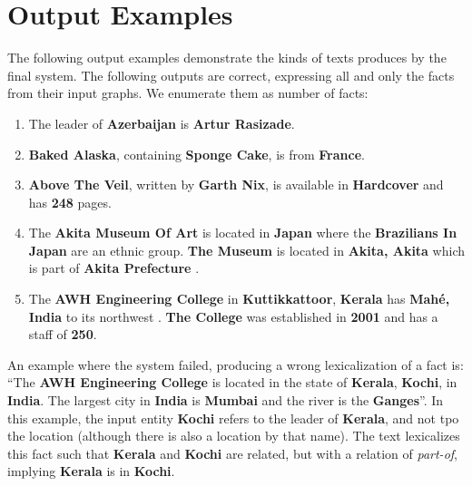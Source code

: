 \documentclass[11pt,a4paper,table,xcdraw]{article}
\begin{document}
\section{Output Examples}
The following output examples demonstrate the kinds of texts produces by the final system. 
The following outputs are correct, expressing all and only the facts from their input graphs. We enumerate them as number of facts:
\begin{enumerate}
    \item The leader of \textbf{Azerbaijan} is \textbf{Artur Rasizade}.
    \item \textbf{Baked Alaska}, containing \textbf{Sponge Cake}, is from \textbf{France}.
    \item \textbf{Above The Veil}, written by \textbf{Garth Nix}, is available in \textbf{Hardcover} and has \textbf{248} pages.
    \item The \textbf{Akita Museum Of Art} is located in \textbf{Japan} where the \textbf{Brazilians In Japan} are an ethnic group. \textbf{The Museum} is located in \textbf{Akita, Akita} which is part of \textbf{Akita Prefecture} .
    \item The \textbf{AWH Engineering College} in \textbf{Kuttikkattoor}, \textbf{Kerala} has \textbf{Mahé, India} to its northwest . \textbf{The College} was established in \textbf{2001} and has a staff of \textbf{250}.
\end{enumerate}

An example where the system failed, producing a wrong lexicalization of a fact is: ``The \textbf{AWH Engineering College} is located in the state of \textbf{Kerala}, \textbf{Kochi}, in \textbf{India}. The largest city in \textbf{India} is \textbf{Mumbai} and the river is the \textbf{Ganges}''. In this example, the input entity \textbf{Kochi} refers to the leader of \textbf{Kerala}, and not tpo the location (although there is also a location by that name).  The text lexicalizes this fact such that \textbf{Kerala} and \textbf{Kochi} are related, but with a relation of \emph{part-of}, implying \textbf{Kerala} is in \textbf{Kochi}.
\end{document}
